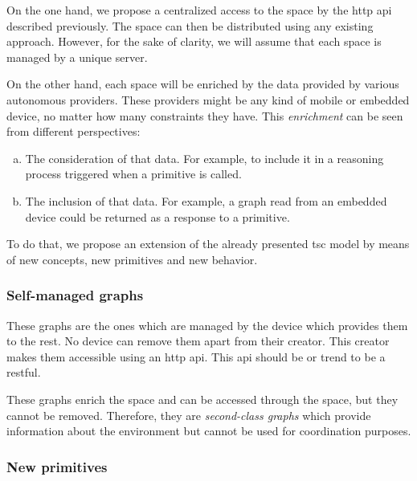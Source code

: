 On the one hand, we propose a centralized access to the space by the \acs{http} \ac{api} described previously.
The space can then be distributed using any existing approach. %
However, for the sake of clarity, we will assume that each space is managed by a unique server.

On the other hand, each space will be enriched by the data provided by various autonomous providers.
These providers might be any kind of mobile or embedded device, no matter how many constraints they have.
This \emph{enrichment} can be seen from different perspectives:
\begin{enumerate}[(a)]
  \item The consideration of that data.
	For example, to include it in a reasoning process triggered when a primitive is called.
  \item The inclusion of that data.
        For example, a graph read from an embedded device could be returned as a response to a primitive.
\end{enumerate}


To do that, we propose an extension of the already presented \ac{tsc} model by means of new concepts, new primitives and new behavior.


\subsubsection{Self-managed graphs}

These graphs are the ones which are managed by the device which provides them to the rest.
No device can remove them apart from their creator.
This creator makes them accessible using an \acs{http} \ac{api}.
This \ac{api} should be or trend to be a \ac{rest}ful.

These graphs enrich the space and can be accessed through the space, but they cannot be removed.
Therefore, they are \emph{second-class graphs} which provide information about the environment but cannot be used for coordination purposes.



\subsubsection{New primitives}

